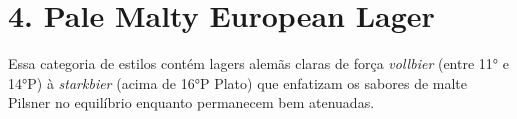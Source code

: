 \section*{4. Pale Malty European Lager}

Essa categoria de estilos contém lagers alemãs claras de força \textit{vollbier} (entre 11° e 14°P) à \textit{starkbier} (acima de 16°P Plato) que enfatizam os sabores de malte Pilsner no equilíbrio enquanto permanecem bem atenuadas.
